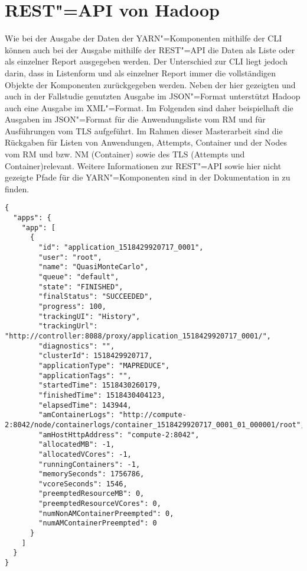 \chapter{REST"=API von Hadoop}
\label{app:hadoopRestApi}

Wie bei der Ausgabe der Daten der YARN"=Komponenten mithilfe der \gls{CLI} können auch bei der Ausgabe mithilfe der \gls{REST}"=API die Daten als Liste oder als einzelner Report ausgegeben werden.
Der Unterschied zur \gls{CLI} liegt jedoch darin, dass in Listenform und als einzelner Report immer die vollständigen Objekte der Komponenten zurückgegeben werden.
Neben der hier gezeigten und auch in der Fallstudie genutzten Ausgabe im JSON"=Format unterstützt Hadoop auch eine Ausgabe im XML"=Format.
Im Folgenden sind daher beispielhaft die Ausgaben im JSON"=Format für die Anwendungsliste vom \gls{RM} und für Ausführungen vom \gls{TLS} aufgeführt.
Im Rahmen dieser Masterarbeit sind die Rückgaben für Listen von Anwendungen, Attempts, \gls{Container} und der Nodes vom \gls{RM} und bzw. \gls{NM} (Container) sowie des \gls{TLS} (Attempts und Container)relevant.
Weitere Informationen zur \gls{REST}"=API sowie hier nicht gezeigte Pfade für die \gls{YARN}"=Komponenten sind in der Dokumentation in \cite{HadoopYarnTlServer271,HadoopRmApi271,HadoopNmApi271} zu finden.

\begin{lstlisting}[label=lst:hadoopAppListRestRm,style=json,
caption={[REST"=-Ausgabe aller \glspl{Anwendung} vom \acrshort{RM}]
    \gls{REST}"=Ausgabe aller \glspl{Anwendung} vom \acrshort{RM}.
    Die Liste kann mithilfe verschiedener Query"=Parameter gefiltert werden.\\
    URL: \url{http://addr:port/ws/v1/cluster/apps}}]
{
  "apps": {
    "app": [
      {
        "id": "application_1518429920717_0001",
        "user": "root",
        "name": "QuasiMonteCarlo",
        "queue": "default",
        "state": "FINISHED",
        "finalStatus": "SUCCEEDED",
        "progress": 100,
        "trackingUI": "History",
        "trackingUrl": "http://controller:8088/proxy/application_1518429920717_0001/",
        "diagnostics": "",
        "clusterId": 1518429920717,
        "applicationType": "MAPREDUCE",
        "applicationTags": "",
        "startedTime": 1518430260179,
        "finishedTime": 1518430404123,
        "elapsedTime": 143944,
        "amContainerLogs": "http://compute-2:8042/node/containerlogs/container_1518429920717_0001_01_000001/root",
        "amHostHttpAddress": "compute-2:8042",
        "allocatedMB": -1,
        "allocatedVCores": -1,
        "runningContainers": -1,
        "memorySeconds": 1756786,
        "vcoreSeconds": 1546,
        "preemptedResourceMB": 0,
        "preemptedResourceVCores": 0,
        "numNonAMContainerPreempted": 0,
        "numAMContainerPreempted": 0
      }
    ]
  }
}
\end{lstlisting}

